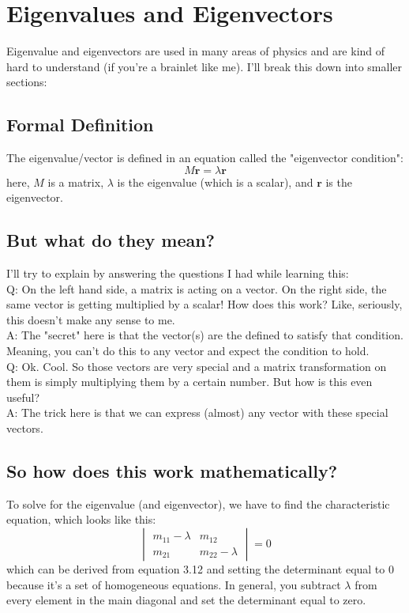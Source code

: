 \documentclass[oneside]{book}
\numberwithin{equation}{chapter} %
\begin{document}
\section{Eigenvalues and Eigenvectors}
Eigenvalue and eigenvectors are used in many areas of physics and are kind of hard to understand (if you're a brainlet like me). I'll break this down into smaller sections:
\subsection{Formal Definition}
The eigenvalue/vector is defined in an equation called the "eigenvector condition":
\begin{equation}
	M\mathbf r=\lambda \mathbf r
\end{equation}
here, $M$ is a matrix, $\lambda$ is the eigenvalue (which is a scalar), and $\mathbf r$ is the eigenvector. 
\subsection{But what do they mean?}
I'll try to explain by answering the questions I had while learning this:\\

Q: On the left hand side, a matrix is acting on a vector. On the right side, the same vector is getting multiplied by a scalar! How does this work? Like, seriously,  this doesn't make any sense to me. \\

A: The "secret" here is that the vector(s) are the defined to satisfy that condition. Meaning, you can't do this to any vector and expect the condition to hold. \\

Q: Ok. Cool. So those vectors are very special and a matrix transformation on them is simply multiplying them by a certain number. But how is this even useful? \\

A: The trick here is that we can express (almost) any vector with these special vectors. 
\subsection{So how does this work mathematically?}
To solve for the eigenvalue (and eigenvector), we have to find the characteristic equation, which looks like this:
$$
\begin{vmatrix}
	m_{11}-\lambda&m_{12}\\
	m_{21}&m_{22}-\lambda
\end{vmatrix}=0
$$
which can be derived from equation 3.12 and setting the determinant equal to 0 because it's a set of homogeneous equations. In general, you subtract $\lambda$ from every element in the main diagonal and set the determinant equal to zero.\\
\end{document}
